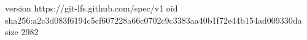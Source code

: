 version https://git-lfs.github.com/spec/v1
oid sha256:a2c3d083f6194c5cf607228a66c0702c9c3383aa40b1f72e44b154ad009330da
size 2982
